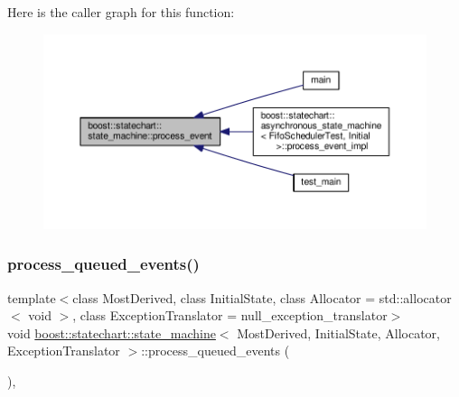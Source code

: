 Here is the caller graph for this function\+:
\nopagebreak
\begin{figure}[H]
\begin{center}
\leavevmode
\includegraphics[width=350pt]{classboost_1_1statechart_1_1state__machine_a78598d4982f6b85e83358652eb1c3d6e_icgraph}
\end{center}
\end{figure}
\mbox{\label{classboost_1_1statechart_1_1state__machine_af158f951f31691cdec6c00b48612124c}} 
\subsubsection{\texorpdfstring{process\+\_\+queued\+\_\+events()}{process\_queued\_events()}}
{\footnotesize\ttfamily template$<$class Most\+Derived, class Initial\+State, class Allocator = std\+::allocator$<$ void $>$, class Exception\+Translator = null\+\_\+exception\+\_\+translator$>$ \\
void \mbox{\hyperlink{classboost_1_1statechart_1_1state__machine}{boost\+::statechart\+::state\+\_\+machine}}$<$ Most\+Derived, Initial\+State, Allocator, Exception\+Translator $>$\+::process\+\_\+queued\+\_\+events (\begin{DoxyParamCaption}{ }\end{DoxyParamCaption})\hspace{0.3cm}{\ttfamily [inline]}, {\ttfamily [private]}}

